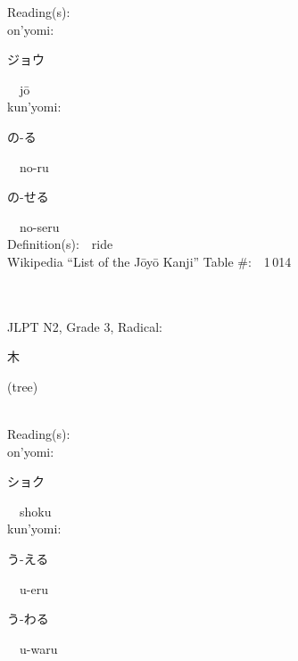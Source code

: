 \begin{multicols}{2}
Reading(s):\ \ \\
{\hspace*{1em}}on'yomi:\ \ \\
{\hspace*{2em}}{\begin{CJK}{UTF8}{min} ジョウ \end{CJK}}\ \ j\=o\ \ \\
{\hspace*{1em}}kun'yomi:\ \ \\
{\hspace*{2em}}{\begin{CJK}{UTF8}{min} の-る \end{CJK}}\ \ no-ru\ \ \\
{\hspace*{2em}}{\begin{CJK}{UTF8}{min} の-せる \end{CJK}}\ \ no-seru\ \ \\
Definition(s):\ \ ride \\
Wikipedia ``List of the J\=oy\=o Kanji'' Table \#:\ \ 1\,014 \\
\ \ \\
{\fontsize{34pt}{40pt}  }\ \ \\  %
{JLPT N2, Grade 3, Radical:\ \ {\begin{CJK}{UTF8}{min} 木 \end{CJK}} (tree) } \\
Reading(s):\ \ \\
{\hspace*{1em}}on'yomi:\ \ \\
{\hspace*{2em}}{\begin{CJK}{UTF8}{min} ショク \end{CJK}}\ \ shoku\ \ \\
{\hspace*{1em}}kun'yomi:\ \ \\
{\hspace*{2em}}{\begin{CJK}{UTF8}{min} う-える \end{CJK}}\ \ u-eru\ \ \\
{\hspace*{2em}}{\begin{CJK}{UTF8}{min} う-わる \end{CJK}}\ \ u-waru\ \ \\

\end{multicols}
